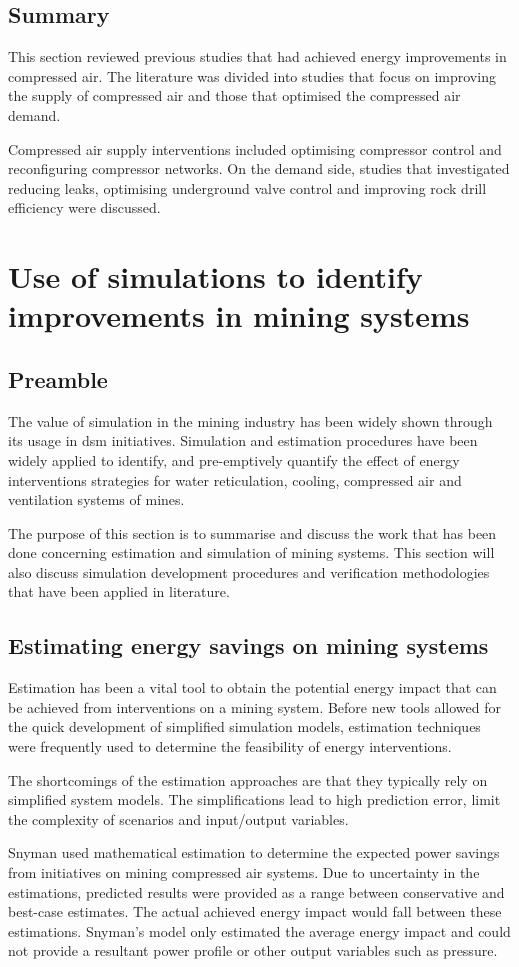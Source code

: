 	\subsection{Summary}
	This section reviewed previous studies that had achieved energy improvements in compressed air. The literature was divided into studies that focus on improving the supply of compressed air and those that optimised the compressed air demand.
	\par
	Compressed air supply interventions included optimising compressor control and reconfiguring compressor networks. On the demand side, studies that investigated reducing leaks, optimising underground valve control and improving rock drill efficiency were discussed.
\section{Use of simulations to identify improvements in mining systems}
	\subsection{Preamble}
	The value of simulation in the mining industry has been widely shown through its usage in \gls{dsm} initiatives. Simulation and estimation procedures have been widely applied to identify, and pre-emptively quantify the effect of energy interventions strategies for water reticulation, cooling, compressed air and ventilation systems of mines.
	\par
	 The purpose of this section is to summarise and discuss the work that has been done concerning estimation and simulation of mining systems. This section will also discuss simulation development procedures and verification methodologies that have been applied in literature.
	
	\subsection{Estimating energy savings on mining systems }
	Estimation has been a vital tool to obtain the potential energy impact that can be achieved from interventions on a mining system. Before new tools allowed for the quick development of simplified simulation models, estimation techniques were frequently used to determine the feasibility of energy interventions. 
	\clearpage
	\par 
	The shortcomings of the estimation approaches are that they typically rely on simplified system models. The simplifications lead to high prediction error, limit the complexity of scenarios and input/output variables.
		\par 
	Snyman \cite{Snyman2011Masters} used mathematical estimation to determine the expected power savings from initiatives on mining compressed air systems. Due to uncertainty in the estimations, \cite{Snyman2011Masters} predicted results were provided as a range between conservative and best-case estimates. The actual achieved energy impact would fall between these estimations. Snyman's model only estimated the average energy impact and could not provide a resultant power profile or other output variables such as pressure.
		 	
